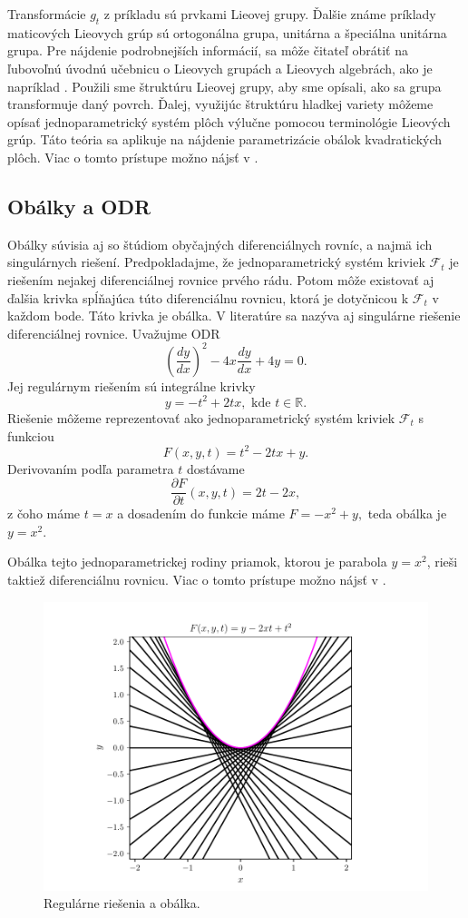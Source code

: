 Transformácie $g_{t}$ z príkladu sú prvkami Lieovej grupy. Ďalšie známe príklady maticových Lieovych grúp sú ortogonálna grupa, unitárna a špeciálna unitárna grupa. 
Pre nájdenie podrobnejších informácií, sa môže čitateľ obrátiť na ľubovoľnú úvodnú učebnicu o Lieovych grupách a Lieovych algebrách, ako je napríklad \cite{Lee12}.
Použili sme štruktúru Lieovej grupy, aby sme opísali, ako sa grupa transformuje daný povrch. Ďalej, využijúc štruktúru hladkej variety môžeme opísať jednoparametrický systém plôch výlučne pomocou terminológie Lieových grúp. Táto teória sa aplikuje na nájdenie parametrizácie obálok kvadratických plôch. Viac o tomto prístupe možno nájsť v \cite{Vra22}. 

\subsection{Obálky a ODR}
Obálky súvisia aj so štúdiom obyčajných diferenciálnych rovníc, a najmä ich singulárnych riešení. Predpokladajme, že jednoparametrický systém kriviek $\mathcal{F}_t$ je riešením nejakej diferenciálnej rovnice prvého rádu. Potom môže existovať aj ďalšia krivka spĺňajúca túto diferenciálnu rovnicu, ktorá je dotyčnicou k $\mathcal{F}_t$ v každom bode. Táto krivka je obálka. V literatúre sa nazýva aj singulárne riešenie diferenciálnej rovnice.
Uvažujme ODR 
$$
\left(\frac{dy}{dx}\right)^2 - 4x\frac{dy}{dx} + 4y = 0.
$$
Jej regulárnym riešením sú integrálne krivky 
$$ y = - t^2 + 2tx, \text{ kde } t \in \mathbb{R}.$$
Riešenie môžeme reprezentovať ako jednoparametrický systém kriviek $\mathcal{F}_t$ s funkciou
$$F(x,y,t) = t^2 - 2tx + y. $$
Derivovaním podľa parametra $t$ dostávame
$$\dfrac{\partial F}{\partial t} (x,y,t) = 2t - 2x, $$
z čoho máme $t=x$ a dosadením do funkcie máme $F=-x^2+y,$ teda obálka je $y=x^2.$

Obálka tejto jednoparametrickej rodiny priamok, ktorou je parabola $y = x^2$, rieši taktiež diferenciálnu rovnicu. Viac o tomto prístupe možno nájsť v \cite{Gro97}.

\begin{figure}[H]
	\centering
	\includegraphics{images/odr.pdf}
	\caption{Regulárne riešenia a obálka.}
	\label{fig:odr}
\end{figure}

